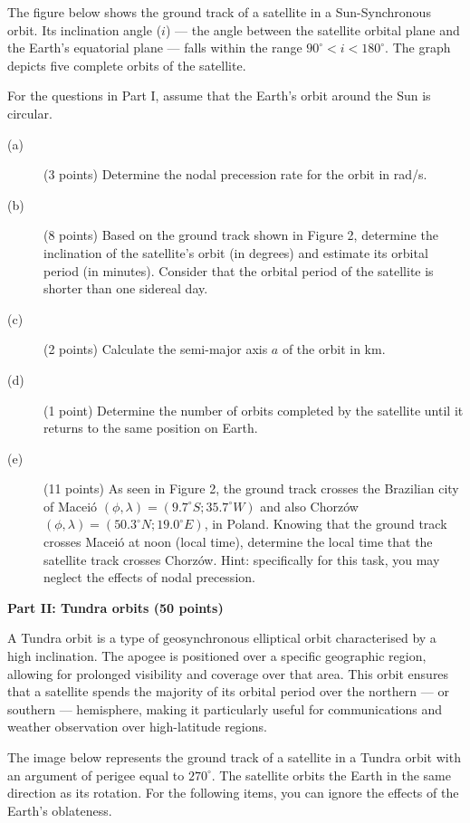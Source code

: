 The figure below shows the ground track of a satellite in a Sun-Synchronous
orbit. Its inclination angle ($i$) --- the angle between the satellite orbital
plane and the Earth's equatorial plane --- falls within the range
$90^\circ < i < 180^\circ$. The graph depicts five complete orbits of the
satellite.


For the questions in Part I, assume that the Earth's orbit around the Sun is
circular.

\begin{description}
\item[(a)] (3 points) Determine the nodal precession rate for the orbit in
  rad/s.
\item[(b)] (8 points) Based on the ground track shown in Figure 2, determine
  the inclination of the satellite's orbit (in degrees) and estimate its
  orbital period (in minutes). Consider that the orbital period of the
  satellite is shorter than one sidereal day.
\item[(c)] (2 points) Calculate the semi-major axis $a$ of the orbit in km.
\item[(d)] (1 point) Determine the number of orbits completed by the satellite
  until it returns to the same position on Earth.
\item[(e)] (11 points) As seen in Figure 2, the ground track crosses the
  Brazilian city of Macei\'o
  $(\phi, \lambda) = (9.7^\circ S; 35.7^\circ W)$ and also Chorz\'ow
  $(\phi, \lambda) = (50.3^\circ N; 19.0^\circ E)$, in Poland. Knowing that
  the ground track crosses Macei\'o at noon (local time), determine the local
  time that the satellite track crosses Chorz\'ow. Hint: specifically for this
  task, you may neglect the effects of nodal precession.
\end{description}

\textbf{Part II: Tundra orbits (50 points)}

A Tundra orbit is a type of geosynchronous elliptical orbit characterised by a
high inclination. The apogee is positioned over a specific geographic region,
allowing for prolonged visibility and coverage over that area. This orbit
ensures that a satellite spends the majority of its orbital period over the
northern --- or southern --- hemisphere, making it particularly useful for
communications and weather observation over high-latitude regions.

The image below represents the ground track of a satellite in a Tundra orbit
with an argument of perigee equal to $270^\circ$. The satellite orbits the
Earth in the same direction as its rotation. For the following items, you can
ignore the effects of the Earth's oblateness.

